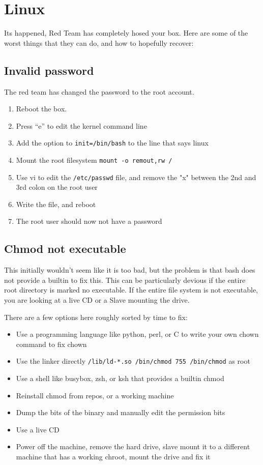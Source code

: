 \section{Linux}

Its happened, Red Team has completely hosed your box.  Here are some of the worst things that they can do, and how to hopefully recover:

\subsection{Invalid password}
The red team has changed the password to the root account.

\begin{enumerate}
	\item Reboot the box.
	\item Press ``e'' to edit the kernel command line
	\item Add the option to \lstinline|init=/bin/bash| to the line that says linux
	\item Mount the root filesystem \lstinline|mount -o remout,rw /|
	\item Use vi to edit the \lstinline|/etc/passwd| file, and remove the "x" between the 2nd and 3rd colon on the root user
	\item Write the file, and reboot
	\item The root user should now not have a password
\end{enumerate}

\subsection{Chmod not executable}

This initially wouldn't seem like it is too bad, but the problem is that bash does not provide a builtin to fix this.
This can be particularly devious if the entire root directory is marked no executable.
If the entire file system is not executable, you are looking at a live CD or a Slave mounting the drive.

There are a few options here roughly sorted by time to fix:

\begin{itemize}
	\item Use a programming language like python, perl, or C to write your own chown command to fix chown
	\item Use the linker directly \lstinline|/lib/ld-*.so /bin/chmod 755 /bin/chmod| as root 
	\item Use a shell like busybox, zsh, or ksh that provides a builtin chmod
	\item Reinstall chmod from repos, or a working machine
	\item Dump the bits of the binary and manually edit the permission bits
	\item Use a live CD
	\item Power off the machine, remove the hard drive, slave mount it to a different machine that has a working chroot, mount the drive and fix it
\end{itemize}

